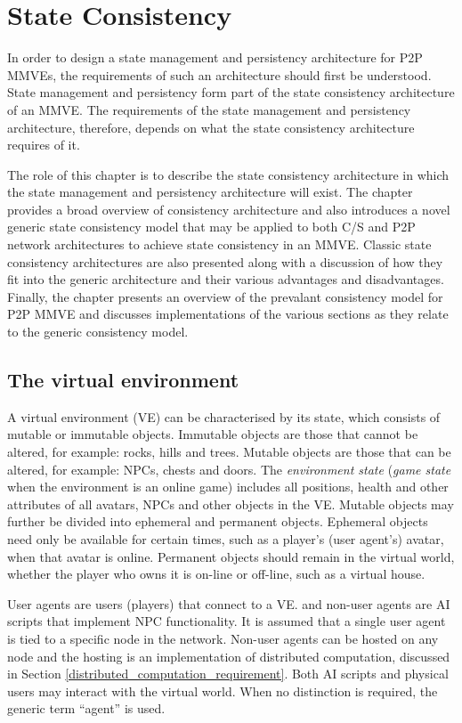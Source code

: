 \chapter{State Consistency}
\label{chp:CONSISTENCY}

In order to design a state management and persistency architecture for P2P MMVEs, the requirements of such an architecture should first be understood. State management and persistency form part of the state consistency architecture of an MMVE. The requirements of the state management and persistency architecture, therefore, depends on what the state consistency architecture requires of it.

The role of this chapter is to describe the state consistency architecture in which the state management and persistency architecture will exist. The chapter provides a broad overview of consistency architecture and also introduces a novel generic state consistency model that may be applied to both C/S and P2P network architectures to achieve state consistency in an MMVE. Classic state consistency architectures are also presented along with a discussion of how they fit into the generic architecture and their various advantages and disadvantages. Finally, the chapter presents an overview of the prevalant consistency model for P2P MMVE and discusses implementations of the various sections as they relate to the generic consistency model.

\section{The virtual environment}

A virtual environment (VE) can be characterised by its state, which consists of mutable or immutable objects. Immutable objects are those that cannot be altered, for example: rocks, hills and trees. Mutable objects are those that can be altered, for example: NPCs, chests and doors. The \emph{environment state} (\emph{game state} when the environment is an online game) includes all positions, health and other attributes of all avatars, NPCs and other objects in the VE. Mutable objects may further be divided into ephemeral and permanent objects. Ephemeral objects need only be available for certain times, such as a player's (user agent's) avatar, when that avatar is online. Permanent objects should remain in the virtual world, whether the player who owns it is on-line or off-line, such as a virtual house.

User agents are users (players) that connect to a VE. and non-user agents are AI scripts that implement NPC functionality. It is assumed that a single user agent is tied to a specific node in the network. Non-user agents can be hosted on any node and the hosting is an implementation of distributed computation, discussed in Section \ref{distributed_computation_requirement}. Both AI scripts and physical users may interact with the virtual world. When no distinction is required, the generic term ``agent'' is used.

